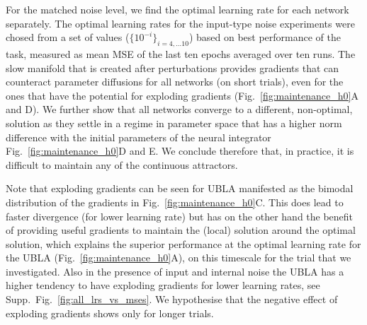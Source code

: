 \documentclass{article} %
\newcounter{ct}
\theoremstyle{definition}
\theoremstyle{remark}
\begin{document}
For the matched noise level, we find the optimal learning rate for each network separately.
The optimal learning rates for the input-type noise experiments were chosed from a set of values 
($\{10^{-i}\}_{i=4,\dots 10}$)  based on best performance of the task, measured as mean MSE of the last ten epochs averaged over ten runs.
The slow manifold that is created after perturbations provides gradients that can counteract parameter diffusions for all networks (on short trials), even for the ones that have the potential for exploding gradients (Fig.~\ref{fig:maintenance_h0}A and D).
 We further show that all networks converge to a different, non-optimal, solution as they settle in a regime in parameter space that has a higher norm difference with the initial parameters of the neural integrator Fig.~\ref{fig:maintenance_h0}D and E.
 We conclude therefore that, in practice, it is difficult to maintain any of the continuous attractors.

Note that exploding gradients can be seen for UBLA manifested as the bimodal distribution of the gradients in Fig.~\ref{fig:maintenance_h0}C. This does lead to faster divergence (for lower learning rate) but has on the other hand the benefit of providing useful gradients to maintain the (local) solution around the optimal solution, which explains the superior performance at the optimal learning rate for the UBLA (Fig.~\ref{fig:maintenance_h0}A), on this timescale for the trial that we investigated.
Also in the presence of input and internal noise the UBLA has a higher tendency to have exploding gradients for lower learning rates, see Supp.~Fig.~\ref{fig:all_lrs_vs_mses}. 
We hypothesise that the negative effect of exploding gradients shows only for longer trials.
\end{document}
